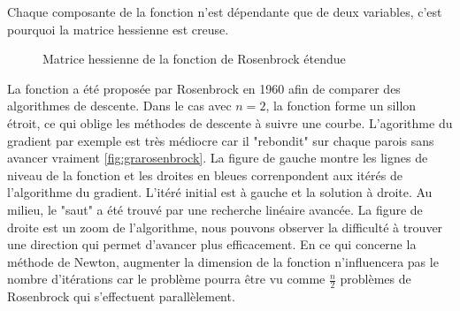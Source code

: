 Chaque composante de la fonction n'est d\'ependante que de deux variables, c'est pourquoi la matrice hessienne est creuse.

\begin{figure}
\caption{Matrice hessienne de la fonction de Rosenbrock \'etendue}
\begin{center}
\end{center}
\label{fig:rosenbrock}
\end{figure}



% 




La fonction a \'et\'e propos\'ee par Rosenbrock en 1960 afin de comparer des algorithmes de descente. Dans 
le cas avec $n=2$, la fonction forme un sillon \'etroit, ce qui oblige les m\'ethodes de descente \`a suivre une courbe. 
L'agorithme du gradient par exemple est tr\`es m\'ediocre car il "rebondit" sur chaque parois sans avancer vraiment {\co \ref{fig:grarosenbrock}.
La figure de gauche montre les lignes de niveau de la fonction et les droites en bleues correnpondent aux it\'er\'es de l'algorithme du gradient.
L'it\'er\'e initial est \`a gauche et la solution \`a droite. Au milieu, le "saut" a \'et\'e trouv\'e par une recherche lin\'eaire avanc\'ee. La figure de droite
est un zoom de l'algorithme, nous pouvons observer la difficult\'e \`a trouver une direction qui permet d'avancer plus efficacement.}
En ce qui concerne la m\'ethode de Newton, augmenter la dimension de la fonction n'influencera pas le nombre d'it\'erations
car le probl\`eme pourra être vu comme $\frac{n}{2}$ probl\`emes de Rosenbrock qui s'effectuent parall\`element.




